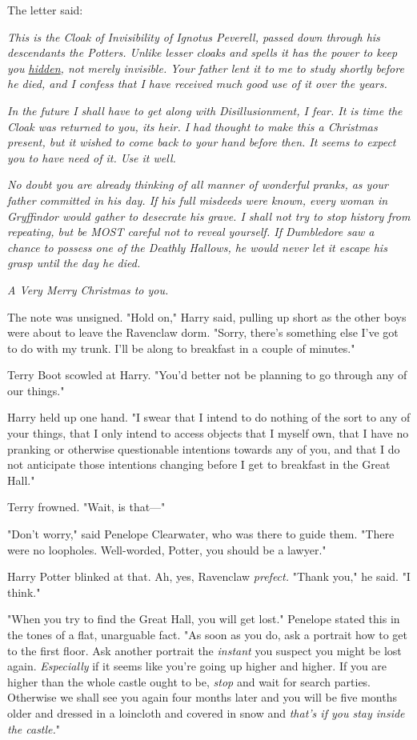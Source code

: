 The letter said:

\emph{This is the Cloak of Invisibility of Ignotus Peverell, passed down through his descendants the Potters. Unlike lesser cloaks and spells it has the power to keep you \underline{hidden}, not merely invisible. Your father lent it to me to study shortly before he died, and I confess that I have received much good use of it over the years.}

\emph{In the future I shall have to get along with Disillusionment, I fear. It is time the Cloak was returned to you, its heir. I had thought to make this a Christmas present, but it wished to come back to your hand before then. It seems to expect you to have need of it. Use it well.}

\emph{No doubt you are already thinking of all manner of wonderful pranks, as your father committed in his day. If his full misdeeds were known, every woman in Gryffindor would gather to desecrate his grave. I shall not try to stop history from repeating, but be MOST careful not to reveal yourself. If Dumbledore saw a chance to possess one of the Deathly Hallows, he would never let it escape his grasp until the day he died.}

\emph{A Very Merry Christmas to you.}

The note was unsigned.
\sbreak
"Hold on," Harry said, pulling up short as the other boys were about to leave the Ravenclaw dorm. "Sorry, there's something else I've got to do with my trunk. I'll be along to breakfast in a couple of minutes."

Terry Boot scowled at Harry. "You'd better not be planning to go through any of our things."

Harry held up one hand. "I swear that I intend to do nothing of the sort to any of your things, that I only intend to access objects that I myself own, that I have no pranking or otherwise questionable intentions towards any of you, and that I do not anticipate those intentions changing before I get to breakfast in the Great Hall."

Terry frowned. "Wait, is that---"

"Don't worry," said Penelope Clearwater, who was there to guide them. "There were no loopholes. Well-worded, Potter, you should be a lawyer."

Harry Potter blinked at that. Ah, yes, Ravenclaw \emph{prefect.} "Thank you," he said. "I think."

"When you try to find the Great Hall, you will get lost." Penelope stated this in the tones of a flat, unarguable fact. "As soon as you do, ask a portrait how to get to the first floor. Ask another portrait the \emph{instant} you suspect you might be lost again. \emph{Especially} if it seems like you're going up higher and higher. If you are higher than the whole castle ought to be, \emph{stop} and wait for search parties. Otherwise we shall see you again four months later and you will be five months older and dressed in a loincloth and covered in snow and \emph{that's if you stay inside the castle.}"

